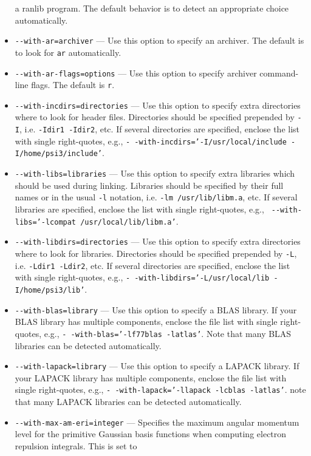 \documentclass[12pt]{article}
\begin{document}
\begin{itemize}
  a ranlib program. The default behavior is to detect an appropriate
  choice automatically.
\item {\tt -}{\tt -with-ar=archiver} --- Use this option to specify an
  archiver.  The default is to look for {\tt ar} automatically.
\item {\tt -}{\tt -with-ar-flags=options} --- Use this option to specify
  archiver command-line flags. The default is {\tt r}.
\item {\tt -}{\tt -with-incdirs=directories} --- Use this option to
  specify extra directories where to look for header
  files. Directories should be specified prepended by {\tt -I},
  i.e. {\tt -Idir1 -Idir2}, etc. If several directories are specified,
  enclose the list with single right-quotes, e.g., {\tt -}{\tt
    -with-incdirs='-I/usr/local/include -I/home/psi3/include'}.
\item {\tt -}{\tt -with-libs=libraries} --- Use this option to specify
  extra libraries which should be used during linking. Libraries
  should be specified by their full names or in the usual {\tt -l}
  notation, i.e. {\tt -lm /usr/lib/libm.a}, etc.  If several libraries
  are specified, enclose the list with single right-quotes, e.g., {\tt
    -}{\tt -with-libs='-lcompat /usr/local/lib/libm.a'}.
\item {\tt -}{\tt -with-libdirs=directories} --- Use this option to
  specify extra directories where to look for libraries. Directories
  should be specified prepended by {\tt -L}, i.e. {\tt -Ldir1 -Ldir2},
  etc. If several directories are specified, enclose the list with
  single right-quotes, e.g., {\tt -}{\tt
    -with-libdirs='-L/usr/local/lib -I/home/psi3/lib'}.
\item {\tt -}{\tt -with-blas=library} --- Use this option to specify a
  BLAS library.  If your BLAS library has multiple components, enclose
  the file list with single right-quotes, e.g., {\tt -}{\tt
    -with-blas='-lf77blas -latlas'}.  Note that many BLAS libraries
  can be detected automatically.
\item {\tt -}{\tt -with-lapack=library} --- Use this option to specify
  a LAPACK library.  If your LAPACK library has multiple components,
  enclose the file list with single right-quotes, e.g., {\tt -}{\tt
    -with-lapack='-llapack -lcblas -latlas'}.  note that many LAPACK
  libraries can be detected automatically.
\item {\tt -}{\tt -with-max-am-eri=integer} --- Specifies the maximum
  angular momentum level for the primitive Gaussian basis functions
  when computing electron repulsion integrals.  This is set to

\end{itemize}
\end{document}
